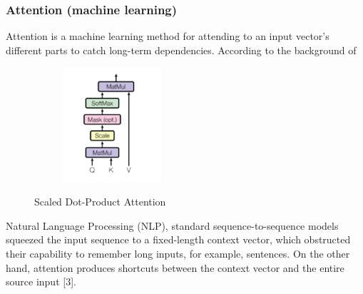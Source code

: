 \documentclass[conference]{IEEEtran}
\begin{document}
\subsubsection{Attention (machine learning)}
Attention is a machine learning method for attending to an input vector’s different parts to catch long-term dependencies. According to the background of 
\begin{figure}[h]
    \centering
    \begin{subfigure}[t]{0.5\textwidth}
        \centering
        \includegraphics[width=0.4\textwidth]{group/Picture3.png}
    \end{subfigure}%
    \caption{Scaled Dot-Product Attention}
\end{figure}
Natural Language Processing (NLP), standard sequence-to-sequence models squeezed the input sequence to a fixed-length context vector, which obstructed their capability to remember long inputs, for example, sentences. On the other hand, attention produces shortcuts between the context vector and the entire source input [3].
\end{document}
